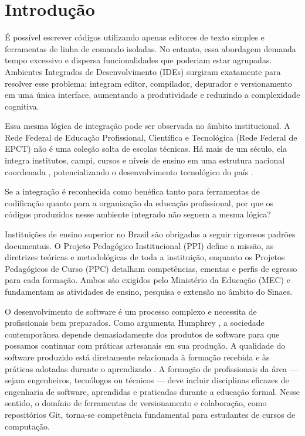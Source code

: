 \documentclass[english, spanish, brazilian]{RBIEarticle}
\begin{document}
\pagebreak


\section{Introdução}
É possível escrever códigos utilizando apenas editores de texto simples e ferramentas de linha de comando isoladas. No entanto, essa abordagem demanda tempo excessivo e dispersa funcionalidades que poderiam estar agrupadas. Ambientes Integrados de Desenvolvimento (IDEs) surgiram exatamente para resolver esse problema: integram editor, compilador, depurador e versionamento em uma única interface, aumentando a produtividade e reduzindo a complexidade cognitiva.

Essa mesma lógica de integração pode ser observada no âmbito institucional. A Rede Federal de Educação Profissional, Científica e Tecnológica (Rede Federal de EPCT) não é uma coleção solta de escolas técnicas. Há mais de um século, ela integra institutos, campi, cursos e níveis de ensino em uma estrutura nacional coordenada \cite{lei11922_2008}, potencializando o desenvolvimento tecnológico do país \cite{pacheco2011}.

Se a integração é reconhecida como benéfica tanto para ferramentas de codificação quanto para a organização da educação profissional, por que os códigos produzidos nesse ambiente integrado não seguem a mesma lógica?

Instituições de ensino superior no Brasil são obrigadas a seguir rigorosos padrões documentais. O Projeto Pedagógico Institucional (PPI) define a missão, as diretrizes teóricas e metodológicas de toda a instituição, enquanto os Projetos Pedagógicos de Curso (PPC) detalham competências, ementas e perfis de egresso para cada formação. Ambos são exigidos pelo Ministério da Educação (MEC) e fundamentam as atividades de ensino, pesquisa e extensão no âmbito do Sinaes.

O desenvolvimento de software é um processo complexo e necessita de profissionais bem preparados. Como argumenta Humphrey \cite{barr2018}, a sociedade contemporânea depende demasiadamente dos produtos de software para que possamos continuar com práticas artesanais em sua produção. A qualidade do software produzido está diretamente relacionada à formação recebida e às práticas adotadas durante o aprendizado \cite{sommerville2011}. A formação de profissionais da área — sejam engenheiros, tecnólogos ou técnicos — deve incluir disciplinas eficazes de engenharia de software, aprendidas e praticadas durante a educação formal. Nesse sentido, o domínio de ferramentas de versionamento e colaboração, como repositórios Git, torna-se competência fundamental para estudantes de cursos de computação.
\end{document}
